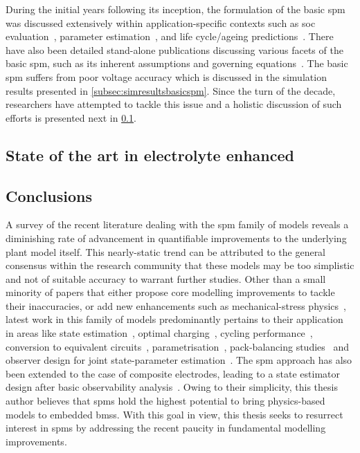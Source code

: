 During  the  initial years  following  its  inception,  the formulation  of  the
basic \gls{spm}  was discussed extensively within  application-specific contexts
such  as  \gls{soc}  evaluation~\cite{Santhanagopalan2006a,Santhanagopalan2008},
parameter    estimation~\cite{Santhanagopalan2007},   and    life   cycle/ageing
predictions~\cite{Santhanagopalan2008a,Safari2009}.   There   have   also   been
detailed   stand-alone   publications   discussing   various   facets   of   the
basic   \gls{spm},   such   as    its   inherent   assumptions   and   governing
equations~\cite{Santhanagopalan2006,Chaturvedi2010}. The basic \gls{spm} suffers
from  poor voltage accuracy which  is discussed in  the simulation  results
presented  in \cref{subsec:simresultsbasicspm}.  Since the  turn of  the decade,
researchers  have attempted  to  tackle  this issue  and a  holistic
discussion of such efforts is presented next in \cref{sec:electrolyteinclusion}.

\subsection{State of the art in electrolyte enhanced }\label{sec:electrolyteinclusion}


\subsection{Conclusions}

A survey  of the  recent  literature dealing with  the \gls{spm}  family of
models reveals a diminishing rate of advancement in quantifiable improvements to
the underlying plant model itself. This nearly-static trend can be attributed to
the general  consensus within the  research community  that these models  may be
too  simplistic  and  not  of  suitable accuracy  to  warrant  further  studies.
Other  than a  small  minority  of papers  that  either  propose core  modelling
improvements  to tackle  their inaccuracies,  or add new  enhancements such  as
mechanical-stress  physics~\cite{Li2017a,Li2018b}, latest  work  in this  family
of  models predominantly  pertains  to  their application  in  areas like  state
estimation~\cite{Chaochun2018,Lin2017,Tran2017,Moura2017,Zou2016a},      optimal
charging~\cite{Perez2017,Perez2017a},    cycling    performance~\cite{Maia2017},
conversion           to            equivalent           circuits~\cite{Li2017b},
parametrisation~\cite{Li2018,Rajabloo2017,Bizeray2017,Namor2017}, pack-balancing
studies~\cite{Docimo2018a}  and   observer  design  for   joint  state-parameter
estimation~\cite{Ascencio2016}. The \gls{spm} approach  has also been extended
to the case of  composite electrodes, leading to  a state estimator design 
after basic observability  analysis~\cite{Bartlett2015}.   Owing  to  their 
simplicity,  this thesis author believes that \glspl{spm} hold the highest
potential to bring physics-based models to embedded \glspl{bms}. With this goal 
in view, this thesis seeks to resurrect interest in \glspl{spm} by addressing the
recent paucity in fundamental modelling improvements. 

